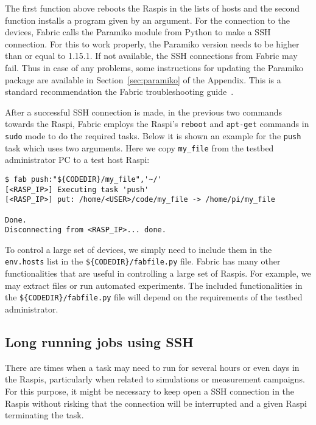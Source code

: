The first function above reboots the \ac{Raspi}s in the lists of hosts and
the second function installs a program given by an argument. For the
connection to the devices, Fabric calls the Paramiko module from Python
to make a \ac{SSH} connection. For this to work properly, the Paramiko
version needs to be higher than or equal to 1.15.1. If not available,
the \ac{SSH} connections from Fabric may fail. Thus in case of any problems,
some instructions for updating the Paramiko package are available in
Section~\ref{sec:paramiko} of the Appendix. This is a standard recommendation
the Fabric troubleshooting guide~\cite{2016fabricsupport}.

After a successful \ac{SSH}
connection is made, in the previous two commands towards the \ac{Raspi},
Fabric employs the \ac{Raspi}'s \texttt{reboot} and \texttt{apt-get}
commands in \texttt{sudo} mode to do the required tasks. Below it is shown
an example for the \texttt{push} task which uses two arguments. Here we
copy \texttt{my\_file} from the testbed administrator \ac{PC} to a test
host \ac{Raspi}:

\begin{lstlisting}[]
$ fab push:"${CODEDIR}/my_file",'~/'
[<RASP_IP>] Executing task 'push'
[<RASP_IP>] put: /home/<USER>/code/my_file -> /home/pi/my_file

Done.
Disconnecting from <RASP_IP>... done.
\end{lstlisting}
\FloatBarrier
\vspace{-5mm}

To control a large set of devices, we simply need to include them in the
\texttt{env.hosts} list in the \texttt{\$\{CODEDIR\}/fabfile.py} file.
Fabric has many other functionalities that are useful in controlling a
large set of \ac{Raspi}s. For example, we may extract files or run
automated experiments. The included functionalities in the
\texttt{\$\{CODEDIR\}/fabfile.py} file will depend on the requirements of the
testbed administrator.

\subsection{Long running jobs using SSH}
There are times when a task may need to run for several hours or even days
in the \ac{Raspi}s, particularly when related to simulations or measurement
campaigns. For this purpose, it might be necessary to keep open a \ac{SSH}
connection in the \ac{Raspi}s without risking that the connection will
be interrupted and a given \ac{Raspi} terminating the task.

